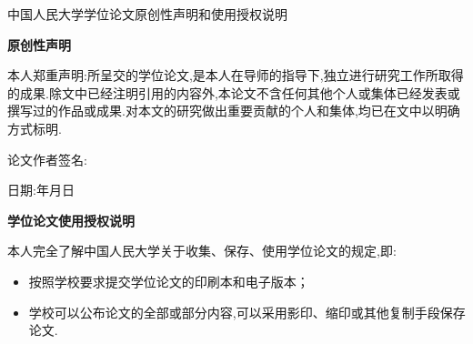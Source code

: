 \documentclass[12pt,UTF8]{ctexart}
\theoremstyle{definition}
\theoremstyle{remark}
\begin{document}
\newpage
\begin{spacing}{1.625}
    \begin{center}
    {
        \heiti{}
        \hspace*{\fill}
        
        \hspace*{\fill}
        
        中国人民大学学位论文原创性声明和使用授权说明
    }
    
         \textbf{原创性声明}
    \end{center}
    
    本人郑重声明:所呈交的学位论文,是本人在导师的指导下,独立进行研究工作所取得的成果.除文中已经注明引用的内容外,本论文不含任何其他个人或集体已经发表或撰写过的作品或成果.对本文的研究做出重要贡献的个人和集体,均已在文中以明确方式标明.
    
    \hspace*{\fill}
    
    \hspace*{\fill}

    \begin{spacing}{2}
        \hspace{23em}论文作者签名:
    
        \hspace{27em}日期:\hspace{2em}年\hspace{2em}月\hspace{2em}日
    \end{spacing}

    \begin{center}
        \hspace*{\fill}

        \hspace*{\fill}

        \hspace*{\fill}

        \textbf{学位论文使用授权说明}
    \end{center}

    \hspace*{\fill}
    
    本人完全了解中国人民大学关于收集、保存、使用学位论文的规定,即:
    \begin{itemize}
        \item[\ding{108}] 按照学校要求提交学位论文的印刷本和电子版本；
        \item[\ding{108}] 学校可以公布论文的全部或部分内容,可以采用影印、缩印或其他复制手段保存论文.
    \end{itemize}
      

\end{spacing}
\end{document}

